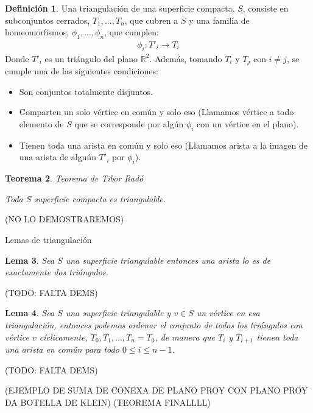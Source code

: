 \documentclass[a4paper,11pt,spanish, twoside, leqno]{tfg-uam}
\newtheorem{teor}{Teorema}[chapter]
\newtheorem{lema}[teor]{Lema}
\theoremstyle{definition}
\newtheorem{defin}[teor]{Definici\'on}
\begin{document}
\begin{defin}\label{defin:triangulacion}
	Una triangulación de una superficie compacta, $S$, consiste en subconjuntos cerrados, ${T_1, ..., T_n}$, que cubren a $S$ y una familia de homeomorfismos, ${\phi_1, ..., \phi_n}$, que cumplen:
	\begin{align*}
	\phi_i: T'_i \longrightarrow T_i
	\end{align*}
	Donde $T'_i$ es un triángulo del plano $\mathbb{R}^2$. Además, tomando $T_i$ y $T_j$ con $i\neq j$, se cumple una de las siguientes condiciones:
	\begin{itemize}
		\item 
		Son conjuntos totalmente disjuntos.
		\item 
		Comparten un solo vértice en común y solo eso (Llamamos vértice a todo elemento de $S$ que se corresponde por algún $\phi_i$ con un vértice en el plano).
		\item 
		Tienen toda una arista en común y solo eso (Llamamos arista a la imagen de una arista de alguún $T'_i$ por $\phi_i$).
	\end{itemize}
\end{defin}


\begin{teor}{Teorema de Tibor Radó}\label{teor:teoremaDeTriangulacion}
	
	Toda $S$ superficie compacta es triangulable.
\end{teor}(NO LO DEMOSTRAREMOS)




Lemas de triangulación
\begin{lema}\label{lema:lema1detriangulacion}
	Sea $S$ una superficie triangulable entonces una arista lo es de exactamente dos triángulos.
\end{lema}(TODO: FALTA DEMS)

\begin{lema}\label{lema:lema2detriangulacion}
	Sea  $S$ una superficie triangulable y $v\in S$ un vértice en esa triangulación, entonces podemos ordenar el conjunto de todos los triángulos con vértice $v$ cíclicamente,  $T_0, T_1, ..., T_n = T_0$, de manera que $T_i$ y $T_{i+1}$ tienen toda una arista en común para todo $0\leq i\leq n-1$.
\end{lema}(TODO: FALTA DEMS)





(EJEMPLO DE SUMA DE CONEXA DE PLANO PROY CON PLANO PROY DA BOTELLA DE KLEIN)
(TEOREMA FINALLLL)
\end{document}
